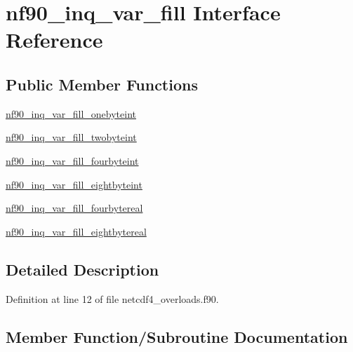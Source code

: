 \hypertarget{interfacenf90__inq__var__fill}{}\section{nf90\+\_\+inq\+\_\+var\+\_\+fill Interface Reference}
\label{interfacenf90__inq__var__fill}
\subsection*{Public Member Functions}
\begin{DoxyCompactItemize}
\item 
\hyperlink{interfacenf90__inq__var__fill_abc48b61cefce17e7ff0d35f088b30ca5}{nf90\+\_\+inq\+\_\+var\+\_\+fill\+\_\+onebyteint}
\item 
\hyperlink{interfacenf90__inq__var__fill_a5998ab62ba6fbf51911074e55966cb5c}{nf90\+\_\+inq\+\_\+var\+\_\+fill\+\_\+twobyteint}
\item 
\hyperlink{interfacenf90__inq__var__fill_a3e32bdcee4e5dfb8cf365cf069f5d499}{nf90\+\_\+inq\+\_\+var\+\_\+fill\+\_\+fourbyteint}
\item 
\hyperlink{interfacenf90__inq__var__fill_a4b3e3f33cf7817bf9d4013bff61e459c}{nf90\+\_\+inq\+\_\+var\+\_\+fill\+\_\+eightbyteint}
\item 
\hyperlink{interfacenf90__inq__var__fill_a947aac0303dd1a663405e234973cfe25}{nf90\+\_\+inq\+\_\+var\+\_\+fill\+\_\+fourbytereal}
\item 
\hyperlink{interfacenf90__inq__var__fill_ac06044c72fda9d50dc281220b4fe8846}{nf90\+\_\+inq\+\_\+var\+\_\+fill\+\_\+eightbytereal}
\end{DoxyCompactItemize}


\subsection{Detailed Description}


Definition at line 12 of file netcdf4\+\_\+overloads.\+f90.



\subsection{Member Function/\+Subroutine Documentation}
\mbox{\label{interfacenf90__inq__var__fill_a4b3e3f33cf7817bf9d4013bff61e459c}} 
